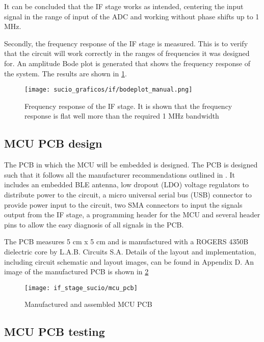 It can be concluded that the IF stage works as intended, centering the input signal in the range of input of the ADC and working without phase shifts up to 1 MHz.

Secondly, the frequency response of the IF stage is measured. This is to verify that the circuit will work correctly in the ranges of frequencies it was designed for. An amplitude Bode plot is generated that shows the frequency response of the system. The results are shown in \cref{fig:if_bode}.

\begin{figure}[htb]
	\centering
	\texttt{[image: sucio\_graficos/if/bodeplot\_manual.png]}
	\caption{Frequency response of the IF stage. It is shown that the frequency response is flat well more than the required 1 MHz bandwidth}
	\label{fig:if_bode}
\end{figure}

\subsection{MCU PCB design}

The PCB in which the MCU will be embedded is designed. The PCB is designed such that it follows all the manufacturer recommendations outlined in \cite{STMicroelectronics2022, STMicroelectronics2022a, STMicroelectronics2022b}. It includes an embedded BLE antenna, low dropout (LDO) voltage regulators to distribute power to the circuit, a micro universal serial bus (USB) connector to provide power input to the circuit, two SMA connectors to input the signals output from the IF stage, a programming header for the MCU and several header pins to allow the easy diagnosis of all signals in the PCB.

The PCB measures 5 cm x 5 cm and is manufactured with a ROGERS 4350B dielectric core by L.A.B. Circuits S.A. Details of the layout and implementation, including circuit schematic and layout images, can be found in Appendix D. An image of the manufactured PCB is shown in \cref{fig:mcu_pcb}

\begin{figure}[h]
	\centering
	\texttt{[image: if\_stage\_sucio/mcu\_pcb]}
	\caption{Manufactured and assembled MCU PCB}
	\label{fig:mcu_pcb}
\end{figure}

\subsection{MCU PCB testing}

